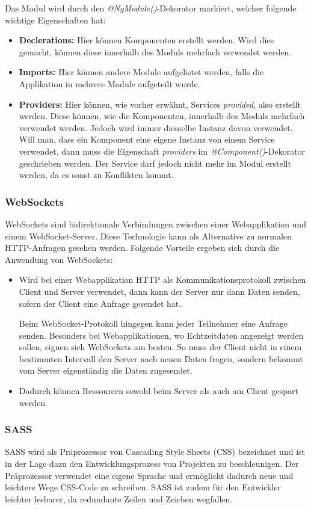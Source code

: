 \clearpage
Das Modul wird durch den \textit{@NgModule()}-Dekorator markiert, welcher folgende wichtige Eigenschaften hat:
\begin{itemize}
    \item \textbf{Declerations:} Hier können Komponenten erstellt werden. Wird dies gemacht, können diese innerhalb des Moduls mehrfach verwendet werden.
    \item \textbf{Imports:} Hier können andere Module aufgelistet werden, falls die Applikation in mehrere Module aufgeteilt wurde.
    \item \textbf{Providers:} Hier können, wie vorher erwähnt, Services \textit{provided}, also erstellt werden. Diese können, wie die Komponenten, innerhalb des Moduls mehrfach verwendet werden. Jedoch wird immer diesselbe Instanz davon verwendet.
    Will man, dass ein Komponent eine eigene Instanz von einem Service verwendet, dann muss die Eigenschaft \textit{providers} im \textit{@Component()}-Dekorator geschrieben werden. Der Service darf jedoch nicht mehr im Modul erstellt werden, da es sonst zu Konflikten kommt.
\end{itemize}

\subsubsection{WebSockets}
\label{sec:websockets}
WebSockets sind bidirektionale Verbindungen zwischen einer Webapplikation und einem WebSocket-Server. Diese Technologie kann als Alternative zu normalen HTTP-Anfragen gesehen werden. Folgende Vorteile ergeben sich durch die Anwendung von WebSockets:
\begin{itemize}
    \item Wird bei einer Webapplikation HTTP als Kommunikationsprotokoll zwischen Client und Server verwendet, dann kann der Server nur dann Daten senden, sofern der Client eine Anfrage gesendet hat.
    
    Beim WebSocket-Protokoll hingegen kann jeder Teilnehmer eine Anfrage senden. Besonders bei Webapplikationen, wo Echtzeitdaten angezeigt werden sollen, eignen sich WebSockets am besten. So muss der Client nicht in einem bestimmten Intervall den Server nach neuen Daten fragen, sondern bekommt vom Server eigenständig die Daten zugesendet.
    
    \item Dadurch können Ressourcen sowohl beim Server als auch am Client gespart werden. 
\end{itemize}
\clearpage
\subsubsection{SASS}
SASS wird als Präprozessor von Cascading Style Sheets (CSS) bezeichnet und ist in der Lage dazu den Entwicklungsprozess von Projekten zu beschleunigen. Der Präprozessor verwendet eine eigene Sprache und ermöglicht dadurch neue und leichtere Wege CSS-Code zu schreiben. SASS ist zudem für den Entwickler leichter lesbarer, da redundante Zeilen und Zeichen wegfallen.

